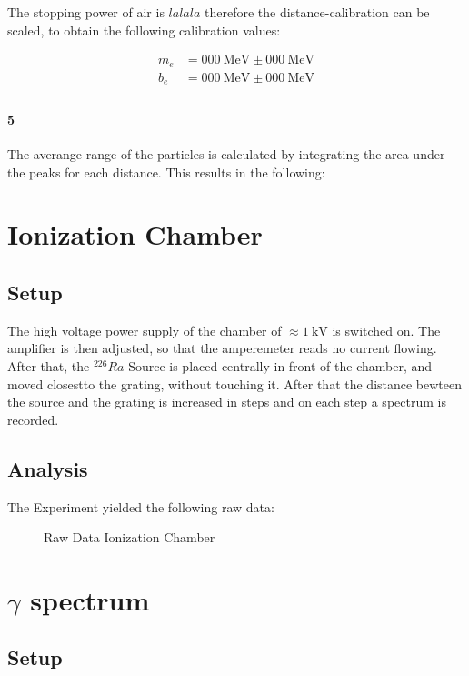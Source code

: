 \documentclass[12pt,twoside,a4paper]{scrartcl}
\begin{document}
				The stopping power of air is $lalala$ therefore the distance-calibration can be scaled, to obtain the following calibration values:

				\begin{align*}
					m_e &= \SI{000}{\mega \electronvolt} \pm \SI{000}{\mega \electronvolt} \\
					b_e &= \SI{000}{\mega \electronvolt} \pm \SI{000}{\mega \electronvolt} \\
				\end{align*}

			\paragraph{5}
				The averange range of the particles is calculated by integrating the area under the peaks for each distance.
				This results in the following:

\section{Ionization Chamber}

	\subsection{Setup}
		 The high voltage power supply of the chamber of $\approx \SI{1}{\kilo \volt}$ is switched on. The amplifier is then adjusted, so that the amperemeter reads no current flowing. After that, the $^{226}Ra$ Source is placed centrally in front of the chamber, and moved closestto the grating, without touching it. After that the distance bewteen the source and the grating is increased in steps and on each step a spectrum is recorded.

	\subsection{Analysis}

		The Experiment yielded the following raw data:

		\begin{figure}
			\caption{Raw Data Ionization Chamber}
		\end{figure}



\section{$\gamma$ spectrum}
	\subsection{Setup}
\end{document}
